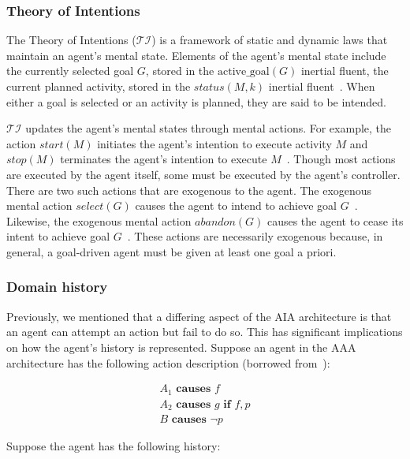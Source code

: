\subsubsection{Theory of Intentions}
\label{subsubsec:theory_of_intentions}

The Theory of Intentions ($\mathcal{TI}$) is a framework of static and dynamic laws that maintain an agent's mental state.
Elements of the agent's mental state include the currently selected goal $G$, stored in the $\mathrm{active\_goal}\left(G\right)$ inertial fluent, the current planned activity, stored in the $status(M, k)$ inertial fluent~\cite{blount_towards_2014}.
When either a goal is selected or an activity is planned, they are said to be intended.

$\mathcal{TI}$ updates the agent's mental states through mental actions.
For example, the action $start(M)$ initiates the agent's intention to execute activity $M$ and $stop(M)$ terminates the agent's intention to execute $M$~\cite{blount_towards_2014}.
Though most actions are executed by the agent itself, some must be executed by the agent's controller.
There are two such actions that are exogenous to the agent.
The exogenous mental action $select(G)$ causes the agent to intend to achieve goal $G$~\cite{blount_towards_2014}.
Likewise, the exogenous mental action $abandon(G)$ causes the agent to cease its intent to achieve goal $G$~\cite{blount_towards_2014}.
These actions are necessarily exogenous because, in general, a goal-driven agent must be given at least one goal a priori.

\subsubsection{Domain history}
\label{subsubsec:domain_history}

Previously, we mentioned that a differing aspect of the AIA architecture is that an agent can attempt an action but fail to do so.
This has significant implications on how the agent's history is represented.
Suppose an agent in the AAA architecture has the following action description (borrowed from~\cite{blount_towards_2014}):

\begin{gather*}
    A_1 \textbf{ causes } f \\
    A_2 \textbf{ causes } g \textbf{ if } f, p \\
    B \textbf{ causes } \neg p
\end{gather*}

Suppose the agent has the following history:

